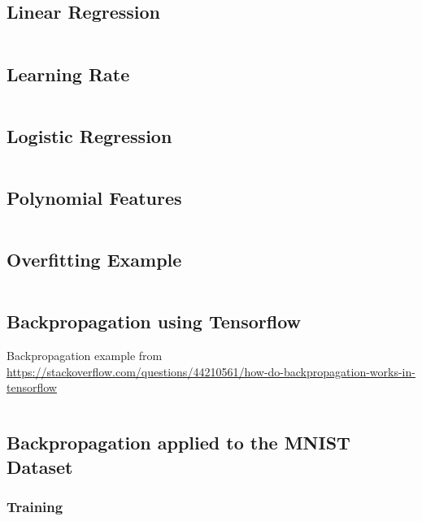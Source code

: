 \documentclass[a4paper,twoside,10pt]{article}
\begin{document}
\subsection{Linear Regression}\label{app:gradientdescent}
\inputminted[frame=lines,linenos,fontsize=\small]{python}{gradient_descent.py}

\subsection{Learning Rate}\label{app:alphas}
\inputminted[frame=lines,linenos,fontsize=\small]{python}{learning_rate.py}

\subsection{Logistic Regression}\label{app:classifier}
\inputminted[frame=lines,linenos,fontsize=\small]{python}{classifier.py}

\subsection{Polynomial Features}\label{app:polynomial}
\inputminted[frame=lines,linenos,fontsize=\small]{python}{polynomial.py}

\subsection{Overfitting Example}\label{app:overfitting}
\inputminted[frame=lines,linenos,fontsize=\small]{python}{overfitting.py}

\subsection{Backpropagation using Tensorflow}\label{app:backprop}
Backpropagation example from \url{https://stackoverflow.com/questions/44210561/how-do-backpropagation-works-in-tensorflow}
\inputminted[frame=lines,linenos,fontsize=\small]{python}{backprop.py}

\subsection{Backpropagation applied to the MNIST Dataset}\label{app:mnistbackprop}
\subsubsection{Training}
\inputminted[frame=lines,linenos,fontsize=\small]{python}{mnist-backprop.py}
\end{document}
